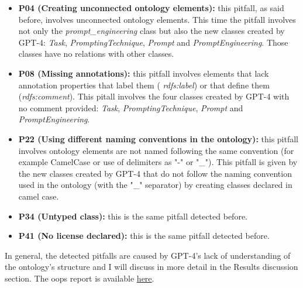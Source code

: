 \begin{itemize}
    \item \textbf{P04 (Creating unconnected ontology elements):} this pitfall, as said before, involves unconnected ontology elements. This time the pitfall involves not only the \textit{prompt\_engineering} class but also the new classes created by GPT-4: \textit{Task}, \textit{PromptingTechnique}, \textit{Prompt} and \textit{PromptEngineering}. Those classes have no relations with other classes.

    \item \textbf{P08 (Missing annotations):} this pitfall involves elements that lack annotation properties that label them ( \textit{rdfs:label}) or that define them\\ (\textit{rdfs:comment}). This pitall involves the four classes created by GPT-4 with no comment provided: \textit{Task}, \textit{PromptingTechnique}, \textit{Prompt} and \textit{PromptEngineering}.  

    \item \textbf{P22 (Using different naming conventions in the ontology):} this pitfall involves ontology elements are not named following the same convention (for example CamelCase or use of delimiters as "-" or "\_"). This pitfall is given by the new classes created by GPT-4 that do not follow the naming convention used in the ontology (with the "\_" separator) by creating classes declared in camel case.

    \item \textbf{P34 (Untyped class):} this is the same pitfall detected before.

    \item \textbf{P41 (No license declared):} this is the same pitfall detected before.
\end{itemize}
In general, the detected pitfalls are caused by GPT-4's lack of understanding of the ontology's structure and I will discuss in more detail in the Results discussion section. The oops report is available \href{https://github.com/simonegramegna/peo/blob/main/evaluation/oops_report_peo_gpt4.xml}{here}.


